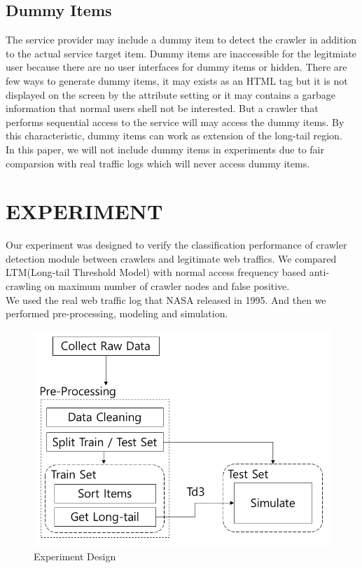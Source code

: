 \documentclass[sigconf,anonymous=true]{acmart}
\begin{document}
\subsection{Dummy Items}
The service provider may include a dummy item to detect the crawler in addition to the actual service target item. Dummy items are inaccessible for the legitmiate user because there are no user interfaces for dummy items or hidden. There are few ways to generate dummy items, it may exists as an HTML tag but it is not displayed on the screen by the attribute setting or it may contains a garbage information that normal users shell not be interested. But a crawler that performs sequential access to the service will may access the dummy items. By this characteristic, dummy items can work as extension of the long-tail region.\\
In this paper, we will not include dummy items in experiments due to fair comparsion with real traffic logs which will never access dummy items.\\



%
%
\section{EXPERIMENT}
Our experiment was designed to verify the classification performance of crawler detection module between crawlers and legitimate  web traffics. We compared LTM(Long-tail Threshold Model) with normal access frequency based anti-crawling on maximum number of crawler nodes and false positive.\\
We used the real web traffic log that NASA released in 1995. And then we performed pre-processing, modeling and simulation.

\begin{figure}[H]
    \centering
    \includegraphics[width=0.85\columnwidth]{figs/figure_design.png}
    \caption{Experiment Design}
    \label{fig:my_label}
\end{figure}
\end{document}

